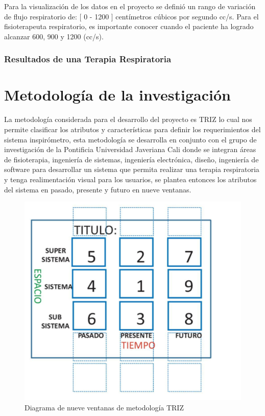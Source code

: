 \documentclass[12pt]{article}
\begin{document}
Para la visualización de los datos en el proyecto se definió un rango de variación de flujo respiratorio de: [ 0 - 1200 ] centímetros cúbicos por segundo cc/s. Para el fisioterapeuta respiratorio, es importante conocer cuando el paciente ha logrado alcanzar 600, 900 y 1200 (cc/s).


\subsubsection{Resultados de una Terapia Respiratoria}










\section{Metodología de la investigación}

La metodología considerada para el desarrollo del proyecto es TRIZ lo cual nos permite clasificar los atributos y características para definir los requerimientos del sistema inspirómetro, esta metodología se desarrolla en conjunto con el grupo de investigación de la Pontificia Universidad Javeriana Cali donde se integran áreas de fisioterapia, ingeniería de sistemas, ingeniería electrónica, diseño, ingeniería de software para desarrollar un sistema que permita realizar una terapia respiratoria y tenga realimentación visual para los usuarios, se plantea entonces los atributos del sistema en pasado, presente y futuro en nueve ventanas.

\begin{figure}[ht]
\centering
\includegraphics[scale=0.45]{imag/9ventanas.png}
\caption{Diagrama de nueve ventanas de metodología TRIZ }
\label{4}
\end{figure}
\FloatBarrier
\end{document}
